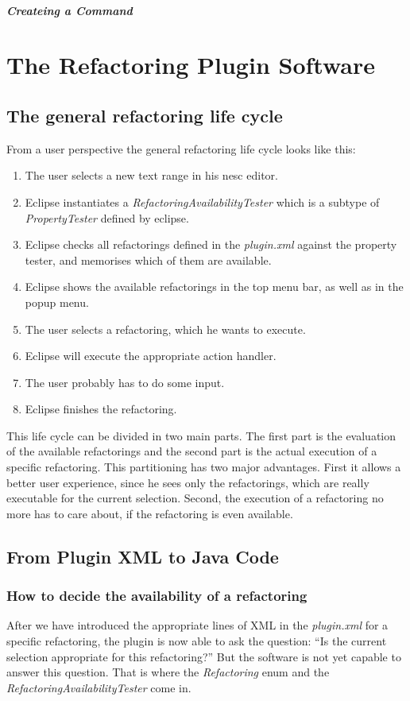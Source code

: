 \documentclass[a4paper,10pt]{report}
\begin{document}
\subsubsection{Createing a Command}


\part{The Refactoring Plugin Software}
\chapter{The general refactoring life cycle}
From a user perspective the general refactoring life cycle looks like this:
   \begin{enumerate}
     \item The user selects a new text range in his nesc editor.
     \item Eclipse instantiates a {\it RefactoringAvailabilityTester} which is a subtype of {\it PropertyTester} defined by eclipse.
     \item Eclipse checks all refactorings defined in the {\it plugin.xml} against the property tester, and memorises which of them are available. 
     \item Eclipse shows the available refactorings in the top menu bar, as well as in the popup menu.
     \item The user selects a refactoring, which he wants to execute.
     \item Eclipse will execute the appropriate action handler.
     \item The user probably has to do some input.
     \item Eclipse finishes the refactoring.
   \end{enumerate}
This life cycle can be divided in two main parts. The first part is the evaluation of the available refactorings and the second part is the actual execution of a specific refactoring. 
This partitioning has two major advantages. First it allows a better user experience, since he sees only the refactorings, which are really executable for the current selection. 
Second, the execution of a refactoring no more has to care about, if the refactoring is even available.

\chapter{From Plugin XML to Java Code}
\section{How to decide the availability of a refactoring}
After we have introduced the appropriate lines of XML in the {\it plugin.xml} for a specific refactoring, the plugin is now able to ask the question: ``Is the current selection appropriate for this refactoring?''
But the software is not yet capable to answer this question. That is where the {\it Refactoring} enum and the {\it RefactoringAvailabilityTester} come in.
\end{document}
